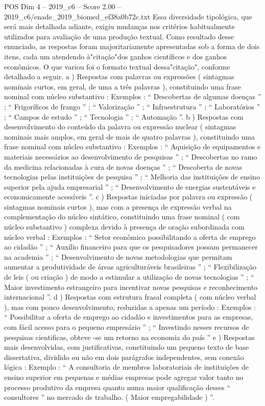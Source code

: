 \begin{textsample}{POS Dim 4 – 2019\_c6 – Score 2.00 – 2019\_c6/enade\_2019\_biomed\_ef38a0b72c.txt}
Essa diversidade tipológica, que será mais detalhada adiante, exigiu mudanças nos critérios habitualmente utilizados para avaliação de uma produção textual.
Como resultado desse enunciado, as respostas foram majoritariamente apresentadas sob a forma de dois itens, cada um atendendo à"citação"dos ganhos científicos e dos ganhos econômicos.
O que variou foi o formato textual dessa"citação", conforme detalhado a seguir. a ) Respostas com palavras ou expressões ( sintagmas nominais curtos, em geral, de uma a três palavras ), constituindo uma frase nominal com núcleo substantivo : Exemplos : “ Descobertas de algumas doenças ” ; “ Frigoríficos de frango ” ; “ Valorização ” ; “ Infraestrutura ” ; “ Laboratórios ” ; “ Campos de estudo ” ; “ Tecnologia ” ; “ Automação ”. b ) Respostas com desenvolvimento do conteúdo da palavra ou expressão nuclear ( sintagmas nominais mais amplos, em geral de mais de quatro palavras ), constituindo uma frase nominal com núcleo substantivo : Exemplos : “ Aquisição de equipamentos e materiais necessários ao desenvolvimento de pesquisas ” ; “ Descobertas no ramo da medicina relacionadas à cura de novas doenças ” ; “ Descoberta de novas tecnologias pelas instituições de pesquisa ” ; “ Melhoria das instituições de ensino superior pela ajuda empresarial ” ; “ Desenvolvimento de energias sustentáveis e economicamente acessíveis ”. c ) Respostas iniciadas por palavra ou expressão ( sintagmas nominais curtos ), mas com a presença de expressão verbal na complementação do núcleo sintático, constituindo uma frase nominal ( com núcleo substantivo ) complexa devido à presença de oração subordinada com núcleo verbal : Exemplos : “ Setor econômico possibilitando a oferta de emprego ao cidadão ” ; “ Auxílio financeiro para que os pesquisadores possam permanecer na academia ” ; “ Desenvolvimento de novas metodologias que permitam aumentar a produtividade de áreas agriculturáveis brasileiras ” ; “ Flexibilização de leis ( ou criação ) de modo a estimular a utilização de novas tecnologias ” ; “ Maior investimento estrangeiro para incentivar novas pesquisas e reconhecimento internacional ”. d ) Respostas com estrutura frasal completa ( com núcleo verbal ), mas com pouco desenvolvimento, reduzidas a apenas um período : Exemplos : “ Possibilitar a oferta de emprego ao cidadão e investimentos para as empresas, com fácil acesso para o pequeno empresário ” ; “ Investindo nesses recursos de pesquisas cientificas, obteve -se um retorno na economia do país ” e ) Respostas mais desenvolvidas, com justificativas, constituindo um pequeno texto de base dissertativa, dividido ou não em dois parágrafos independentes, sem conexão lógica : Exemplo : “ A consultoria de membros laboratoriais de instituições de ensino superior em pequenas e médias empresas pode agregar valor tanto no processo produtivo da empresa quanto numa maior qualificação desses “ consultores ” no mercado de trabalho. ( Maior empregabilidade ) ”.

\end{textsample}
